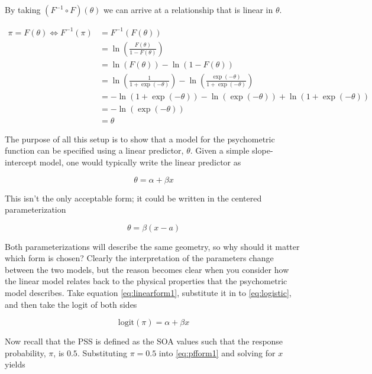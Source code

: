 \documentclass[11pt, oneside, openany]{scrbook}
\begin{document}
By taking \((F^{-1} \circ F)(\theta)\) we can arrive at a relationship that is linear in \(\theta\).

\begin{align*}
  \pi = F(\theta) \Longleftrightarrow F^{-1}(\pi) &= F^{-1}(F(\theta)) \\
  & = \ln\left(\frac{F(\theta)}{1 - F(\theta)}\right) \\
  &= \ln(F(\theta)) - \ln(1 - F(\theta)) \\
  &= \ln\left(\frac{1}{1 + \exp(-\theta)}\right) - \ln\left(\frac{\exp(-\theta)}{1 + \exp(-\theta)}\right) \\
  &= - \ln(1 + \exp(-\theta)) - \ln(\exp(-\theta)) + \ln(1 + \exp(-\theta)) \\
  &= - \ln(\exp(-\theta)) \\
  &= \theta
\end{align*}

The purpose of all this setup is to show that a model for the psychometric function can be specified using a linear predictor, \(\theta\). Given a simple slope-intercept model, one would typically write the linear predictor as

\begin{equation}
  \theta = \alpha + \beta x
  \label{eq:linearform1}
\end{equation}

This isn't the only acceptable form; it could be written in the centered parameterization

\begin{equation}
  \theta = \beta(x - a)
  \label{eq:linearform2}
\end{equation}

Both parameterizations will describe the same geometry, so why should it matter which form is chosen? Clearly the interpretation of the parameters change between the two models, but the reason becomes clear when you consider how the linear model relates back to the physical properties that the psychometric model describes. Take equation \eqref{eq:linearform1}, substitute it in to \eqref{eq:logistic}, and then take the logit of both sides

\begin{equation}
  \mathrm{logit}(\pi) = \alpha+\beta x
  \label{eq:pfform1}
\end{equation}

Now recall that the PSS is defined as the SOA values such that the response probability, \(\pi\), is \(0.5\). Substituting \(\pi = 0.5\) into \eqref{eq:pfform1} and solving for \(x\) yields
\end{document}
